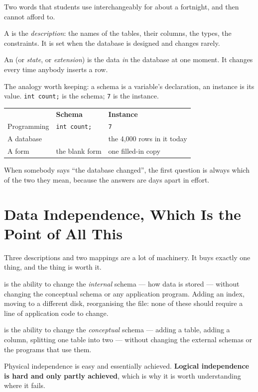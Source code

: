 Two words that students use interchangeably for about a fortnight, and then
cannot afford to.

\begin{definitionbox}
A  is the \emph{description}: the names of the tables, their
columns, the types, the constraints. It is set when the database is designed
and changes rarely.

\smallskip
An  (or \emph{state}, or \emph{extension}) is the data
\emph{in} the database at one moment. It changes every time anybody inserts a
row.

\smallskip
The analogy worth keeping: a schema is a variable's declaration, an instance
is its value. \texttt{int count;} is the schema; \texttt{7} is the instance.
\end{definitionbox}

\begin{examplebox}
\begin{tabular}{@{}L{4.0cm}L{5.0cm}L{5.0cm}@{}}
& \textbf{Schema} & \textbf{Instance} \\
Programming & \texttt{int count;} & \texttt{7} \\
A database &  &
the 4{,}000 rows in it today \\
A form & the blank form & one filled-in copy \\
\end{tabular}

\smallskip
When somebody says ``the database changed'', the first question is always
which of the two they mean, because the answers are days apart in effort.
\end{examplebox}

\section{Data Independence, Which Is the Point of All This}

Three descriptions and two mappings are a lot of machinery. It buys exactly
one thing, and the thing is worth it.

\begin{definitionbox}
 is the ability to change the \emph{internal}
schema --- how data is stored --- without changing the conceptual schema or
any application program. Adding an index, moving to a different disk,
reorganising the file: none of these should require a line of application code
to change.

\smallskip
{} is the ability to change the
\emph{conceptual} schema --- adding a table, adding a column, splitting one
table into two --- without changing the external schemas or the programs that
use them.

\smallskip
Physical independence is easy and essentially achieved. \textbf{Logical
independence is hard and only partly achieved}, which is why it is worth
understanding where it fails.
\end{definitionbox}


